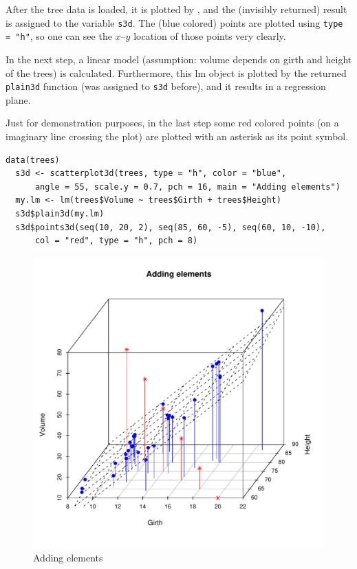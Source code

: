 After the tree data is loaded, it is plotted by \sdd ,
and the (invisibly returned) result is assigned to the variable {\tt s3d}.
The (blue colored) points are plotted using {\tt type = "h"},
so one can see the $x$--$y$ location of those points very clearly.

In the next step, a linear model (assumption: volume depends on girth and height of the trees) is calculated.
Furthermore, this \textsf{lm} object is plotted by the returned {\tt plain3d} function (was assigned to {\tt s3d} before),
and it results in a regression plane.

Just for demonstration purposes, in the last step some red colored points (on a imaginary line crossing the plot)
are plotted with an asterisk as its point symbol.

\vspace*{10mm}
\small
\begin{Verbatim}[frame=single]
  data(trees)
  s3d <- scatterplot3d(trees, type = "h", color = "blue",
      angle = 55, scale.y = 0.7, pch = 16, main = "Adding elements")
  my.lm <- lm(trees$Volume ~ trees$Girth + trees$Height)
  s3d$plain3d(my.lm)
  s3d$points3d(seq(10, 20, 2), seq(85, 60, -5), seq(60, 10, -10),
      col = "red", type = "h", pch = 8)
\end{Verbatim}
\normalsize

\clearpage
\begin{figure}[htb!]
\begin{center}
\includegraphics[width=13cm]{elements}
\end{center}
\vspace*{-10mm}\caption{Adding elements\label{elements}}
\end{figure}


